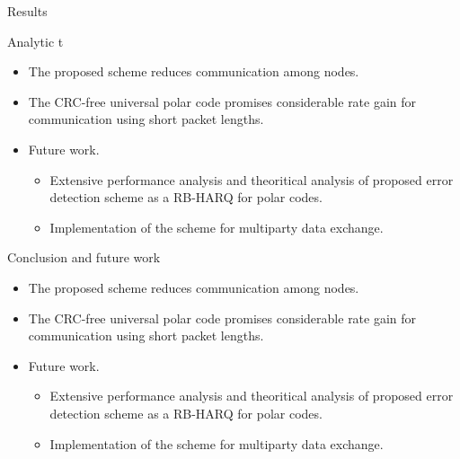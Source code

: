 \documentclass[final,hyperref={pdfpagelabels=false}]{beamer}
\begin{document}
\begin{frame}[t]
\begin{columns}[t]
\begin{column}{.465\textwidth}
\begin{block}{Results}
\end{block}
\begin{block}{Analytic t}
\begin{itemize}
\color{tacream}
\item The proposed scheme reduces communication among nodes.
\item The CRC-free universal polar code promises considerable rate gain for communication using short packet lengths.
\end{itemize}
\begin{itemize}
\item Future work.
\begin{itemize}
\item Extensive performance analysis and theoritical analysis of proposed error detection scheme as a RB-HARQ for polar codes.
\item Implementation of the scheme for multiparty data exchange.
\end{itemize}
\end{itemize}
\end{block}


\begin{block}{Conclusion and future work}
\begin{itemize}
\color{tacream}
\item The proposed scheme reduces communication among nodes.
\item The CRC-free universal polar code promises considerable rate gain for communication using short packet lengths.
\end{itemize}
\begin{itemize}
\item Future work.
\begin{itemize}
\item Extensive performance analysis and theoritical analysis of proposed error detection scheme as a RB-HARQ for polar codes.
\item Implementation of the scheme for multiparty data exchange.
\end{itemize}
\end{itemize}
\end{block}


\end{column}
\end{columns}
\end{frame}
\end{document}
